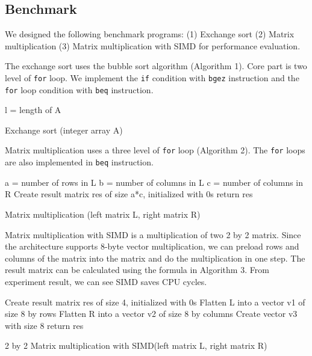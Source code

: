 \documentclass{sig-alternate}
\begin{document}
\subsection{Benchmark}
We designed the following benchmark programs: (1) Exchange sort (2) Matrix multiplication (3) Matrix multiplication with SIMD for performance evaluation. 

The exchange sort uses the bubble sort algorithm (Algorithm 1). Core part is two level of \texttt{for} loop. We implement the \texttt{if} condition with \texttt{bgez} instruction and the \texttt{for} loop condition with \texttt{beq} instruction.

\begin{algorithm}[]
\SetAlgoLined
 l = length of A\;
\caption{Exchange sort (integer array A)}
\end{algorithm}

Matrix multiplication uses a three level of \texttt{for} loop (Algorithm 2). The \texttt{for} loops are also implemented in \texttt{beq} instruction. 

\begin{algorithm}[]
\SetAlgoLined
 a = number of rows in L\;
 b = number of columns in L\;
 c = number of columns in R\;
 Create result matrix res of size a*c, initialized with 0s\;
 return res\;
 \caption{Matrix multiplication (left matrix L, right matrix R)}
\end{algorithm}

Matrix multiplication with SIMD is a multiplication of two 2 by 2 matrix. Since the architecture supports 8-byte vector multiplication, we can preload rows and columns of the matrix into the matrix and do the multiplication in one step. The result matrix can be calculated using the formula in Algorithm 3. From experiment result, we can see SIMD saves CPU cycles. 

\begin{algorithm}[]
\SetAlgoLined
 Create result matrix res of size 4, initialized with 0s\;
 Flatten L into a vector v1 of size 8 by rows\;
 Flatten R into a vector v2 of size 8 by columns\;
Create vector v3 with size 8\;
 return res\;
 \caption{2 by 2 Matrix multiplication with SIMD(left matrix L, right matrix R)}
\end{algorithm}
\end{document}

